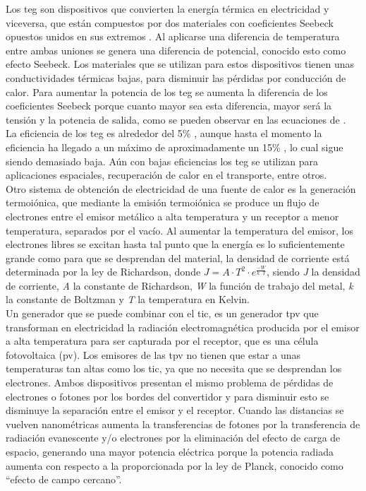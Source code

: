 Los \acrshort{teg} son dispositivos que convierten la energía térmica en electricidad y viceversa, que están compuestos por dos materiales con coeficientes Seebeck opuestos unidos en sus extremos \cite{tegDef1}. Al aplicarse una diferencia de temperatura entre ambas uniones se genera una diferencia de potencial, conocido esto como efecto Seebeck. Los materiales que se utilizan para estos dispositivos tienen unas conductividades térmicas bajas, para disminuir las pérdidas por conducción de calor. Para aumentar la potencia de los \acrshort{teg} se aumenta la diferencia de los coeficientes Seebeck porque cuanto mayor sea esta diferencia, mayor será la tensión y la potencia de salida, como se pueden observar en las ecuaciones de \cite{tegDef1}.\\

La eficiencia de los \acrshort{teg} es alrededor del 5\% \cite{TEG5efficiency}, aunque hasta el momento la eficiencia ha llegado a un máximo de aproximadamente un 15\% \cite{TEG15efficiency}, lo cual sigue siendo demasiado baja. Aún con bajas eficiencias los \acrshort{teg} se utilizan para aplicaciones espaciales, recuperación de calor en el transporte, entre otros.\\


Otro sistema de obtención de electricidad de una fuente de calor es la generación termoiónica, que mediante la emisión termoiónica se produce un flujo de electrones entre el emisor metálico a alta temperatura y un receptor a menor temperatura, separados por el vacío. Al aumentar la temperatura del emisor, los electrones libres se excitan hasta tal punto que la energía es lo suficientemente grande como para que se desprendan del material, la densidad de corriente está determinada por la ley de Richardson, donde $J=A\cdot T^2\cdot e^{\frac{-W}{k\cdot T}}$, siendo \textit{J} la densidad de corriente, \textit{A} la constante de Richardson, \textit{W} la función de trabajo del metal, \textit{k} la constante de Boltzman y \textit{T} la temperatura en Kelvin.\\

Un generador que se puede combinar con el \acrshort{tic}, es un generador \acrshort{tpv} que transforman en electricidad la radiación electromagnética producida por el emisor a alta temperatura para ser capturada por el receptor, que es una célula fotovoltaica (\acrshort{pv}). Los emisores de las \acrshort{tpv} no tienen que estar a unas temperaturas tan altas como los \acrshort{tic}, ya que no necesita que se desprendan los electrones. Ambos dispositivos presentan el mismo problema de pérdidas de electrones o fotones por los bordes del convertidor y para disminuir esto se disminuye la separación entre el emisor y el receptor. Cuando las distancias se vuelven nanométricas aumenta la transferencias de fotones por la transferencia de radiación evanescente y/o electrones por la eliminación del efecto de carga de espacio, generando una mayor potencia eléctrica porque la potencia radiada aumenta con respecto a la proporcionada por la ley de Planck, conocido como ``efecto de campo cercano''.\\

